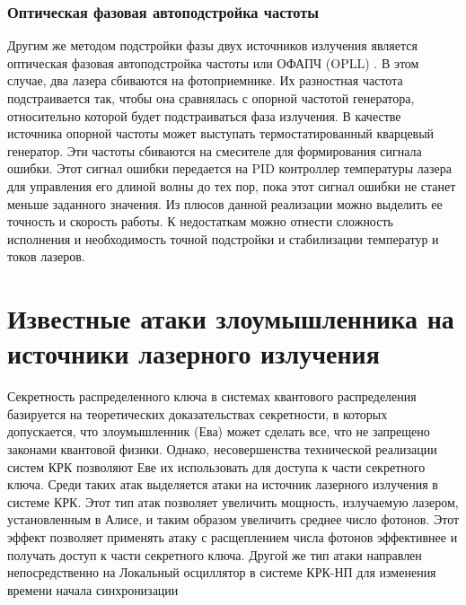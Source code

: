 \subsubsection{Оптическая фазовая автоподстройка частоты}
Другим же методом подстройки фазы двух источников излучения является оптическая фазовая автоподстройка частоты или ОФАПЧ (OPLL) \cite{khaksar2023}. В этом случае, два лазера сбиваются на фотоприемнике. Их разностная частота подстраивается так, чтобы она сравнялась с опорной частотой генератора, относительно которой будет подстраиваться фаза излучения. 
В качестве источника опорной частоты может выступать термостатированный кварцевый генератор. Эти частоты сбиваются на смесителе для формирования сигнала ошибки. Этот сигнал ошибки передается на PID контроллер температуры лазера для управления его длиной волны до тех пор, пока этот сигнал ошибки не станет меньше заданного значения.
Из плюсов данной реализации можно выделить ее точность и скорость работы. К недостаткам можно отнести сложность исполнения и необходимость точной подстройки и стабилизации температур и токов лазеров.

\section{Известные атаки злоумышленника на источники лазерного излучения}\label{sec:ch1/sect7}
Секретность распределенного ключа в системах квантового распределения базируется на теоретических доказательствах секретности, в которых допускается, что злоумышленник (Ева) может сделать все, что не запрещено законами квантовой физики. Однако, несовершенства технической реализации систем КРК позволяют Еве их использовать для доступа к части секретного ключа. Среди таких атак выделяется атаки на источник лазерного излучения в системе КРК. Этот тип атак позволяет увеличить мощность, излучаемую лазером, установленным в Алисе, и таким образом увеличить среднее число фотонов. Этот эффект позволяет применять атаку с расщеплением числа фотонов эффективнее и получать доступ к части секретного ключа. 
\newline Другой же тип атаки направлен непосредственно на Локальный осциллятор в системе КРК-НП для изменения времени начала синхронизации
